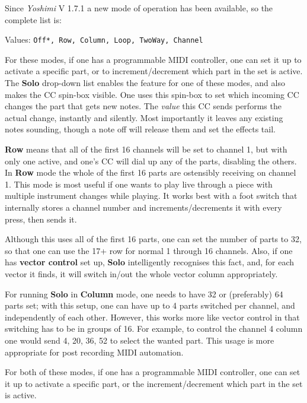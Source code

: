    Since \textsl{Yoshimi} V 1.7.1 a new mode of operation has been available, so the complete list is:

   Values: \texttt{Off*, Row, Column, Loop, TwoWay, Channel}

   For these modes, if one has a programmable MIDI controller, one can set it
   up to activate a specific part, or to increment/decrement which part in the
   set is active.  The \textbf{Solo} drop-down list enables the feature for
   one of these modes, and also makes the CC spin-box visible.
   One uses this spin-box to set which incoming CC changes the part that gets
   new notes.
   The \textsl{value} this CC sends performs the actual change, instantly and
   silently. Most importantly it leaves any existing notes sounding, though a
   note off will release them and set the effects tail.

   \textbf{Row} means that all of the first 16 channels will be set to channel
   1, but with only one active, and one's CC will dial up any of the parts,
   disabling the others.
   In \textbf{Row} mode the whole of the first 16 parts are ostensibly
   receiving on channel 1.  This mode is most useful if one wants to play live
   through a piece with multiple instrument changes while playing. It works
   best with a foot switch that internally stores a channel number and
   increments/decrements it with every press, then sends it.

   Although this uses all of the first 16 parts, one can set the number of
   parts to 32, so that one can use the 17+ row for normal 1 through 16
   channels. Also, if one has \textbf{vector control} set up, \textbf{Solo}
   intelligently recognises this fact, and, for each vector it finds, it will
   switch in/out the whole vector column appropriately.

   For running \textbf{Solo} in \textbf{Column} mode, one needs to have 32 or
   (preferably) 64 parts set; with this setup, one can have up to 4 parts
   switched per channel, and independently of each other. However, this works
   more like vector control in that switching has to be in groups of 16. For
   example, to control the channel 4 column one would send 4, 20, 36, 52 to
   select the wanted part. This usage is more appropriate for post recording
   MIDI automation.

   For both of these modes, if one has a programmable MIDI controller, one can
   set it up to activate a specific part, or the increment/decrement which part
   in the set is active.

